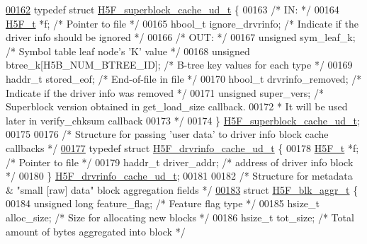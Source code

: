 \begin{DoxyCode}
\hyperlink{struct_h5_f__superblock__cache__ud__t}{00162} \textcolor{keyword}{typedef} \textcolor{keyword}{struct }\hyperlink{struct_h5_f__superblock__cache__ud__t}{H5F\_superblock\_cache\_ud\_t} \{
00163 \textcolor{comment}{/* IN: */}
00164     \hyperlink{struct_h5_f__t}{H5F\_t} *f;               \textcolor{comment}{/* Pointer to file */}
00165     hbool\_t ignore\_drvrinfo; \textcolor{comment}{/* Indicate if the driver info should be ignored */}
00166 \textcolor{comment}{/* OUT: */}
00167     \textcolor{keywordtype}{unsigned} sym\_leaf\_k;    \textcolor{comment}{/* Symbol table leaf node's 'K' value */}
00168     \textcolor{keywordtype}{unsigned} btree\_k[H5B\_NUM\_BTREE\_ID]; \textcolor{comment}{/* B-tree key values for each type */}
00169     haddr\_t stored\_eof;     \textcolor{comment}{/* End-of-file in file */}
00170     hbool\_t drvrinfo\_removed; \textcolor{comment}{/* Indicate if the driver info was removed */}
00171     \textcolor{keywordtype}{unsigned}    super\_vers;   \textcolor{comment}{/* Superblock version obtained in get\_load\_size callback. }
00172 \textcolor{comment}{                   * It will be used later in verify\_chksum callback }
00173 \textcolor{comment}{                   */}
00174 \} \hyperlink{struct_h5_f__superblock__cache__ud__t}{H5F\_superblock\_cache\_ud\_t};
00175 
00176 \textcolor{comment}{/* Structure for passing 'user data' to driver info block cache callbacks */}
\hyperlink{struct_h5_f__drvrinfo__cache__ud__t}{00177} \textcolor{keyword}{typedef} \textcolor{keyword}{struct }\hyperlink{struct_h5_f__drvrinfo__cache__ud__t}{H5F\_drvrinfo\_cache\_ud\_t} \{
00178     \hyperlink{struct_h5_f__t}{H5F\_t}   *f;               \textcolor{comment}{/* Pointer to file */}
00179     haddr\_t driver\_addr;      \textcolor{comment}{/* address of driver info block */}
00180 \} \hyperlink{struct_h5_f__drvrinfo__cache__ud__t}{H5F\_drvrinfo\_cache\_ud\_t};
00181 
00182 \textcolor{comment}{/* Structure for metadata & "small [raw] data" block aggregation fields */}
\hyperlink{struct_h5_f__blk__aggr__t}{00183} \textcolor{keyword}{struct }\hyperlink{struct_h5_f__blk__aggr__t}{H5F\_blk\_aggr\_t} \{
00184     \textcolor{keywordtype}{unsigned} \textcolor{keywordtype}{long}       feature\_flag;   \textcolor{comment}{/* Feature flag type */}
00185     hsize\_t             alloc\_size;     \textcolor{comment}{/* Size for allocating new blocks */}
00186     hsize\_t             tot\_size;       \textcolor{comment}{/* Total amount of bytes aggregated into block */}

\end{DoxyCode}
